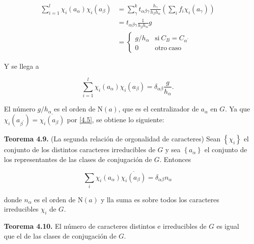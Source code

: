 \documentclass[12pt]{book}
\theoremstyle{definition}
\newcounter{in}
\begin{document}
\begin{equation*}
  \begin{aligned}
    \sum_{i=1}^{l} \chi_{i}(a_{\alpha}) \chi_{i}(a_{\beta}) &= \sum_{\gamma}^{k} t_{\alpha \beta \gamma} \frac{h_{\gamma}}{h_{\beta} h_{\alpha}} (\sum_{i} f_{i} \chi_{i}(a_{\gamma})) \\
    &= t_{\alpha \beta \gamma} \frac{1}{h_{\beta} h_{\alpha}}g \\
    &=  \left\{
	       \begin{array}{ll}
		 g/h_{\alpha}      & \mathrm{si\ } C_{B} = C_{\alpha^{'}} \\
		 0      & \mathrm{otro\ caso\ } 
	       \end{array}
	     \right.
    \end{aligned}
\end{equation*}

Y se llega a

\begin{equation*}
   \sum_{i=1}^{l} \chi_{i}(a_{\alpha}) \chi_{i}(a_{\beta})=\delta_{\alpha \beta} \frac{g}{h_{\alpha}}.
\end{equation*}

El número $g/h_{\alpha}$ es el orden de $\mathrm{N}(a)$, que es el
centralizador de $a_{\alpha}$ en $G$. Ya que
$\chi_{i}(a_{\beta^{'}})=\overline{\chi_{i} (a_{\beta})}$ por
\ref{4.5}, se obtiene lo siguiente:

\textbf{Teorema 4.9. } (La segunda relación de orgonalidad de
caracteres) Sean $\left\{\chi_{i} \right\}$ el conjunto de los
distintos caracteres irreducibles de $G$ y sea
$\left\{a_{\alpha} \right\}$ el conjunto de los representantes de las
clases de conjugación de $G$. Entonces

\begin{equation*}
  \sum_{i} \chi_{i}(a_{\alpha}) \overline{\chi_{i} (a_{\beta})} = \delta_{\alpha \beta} n_{\alpha}
\end{equation*}

donde $n_{\alpha}$ es el orden de $\mathrm{N}(a)$ y lla suma es sobre
todos los caracteres irreducibles $\chi_{i}$ de $G$.

\textbf{Teorema  4.10. } El número de caracteres distintos e irreducibles de $G$ es
igual que el de las clases de conjugación de $G$.
\end{document}
